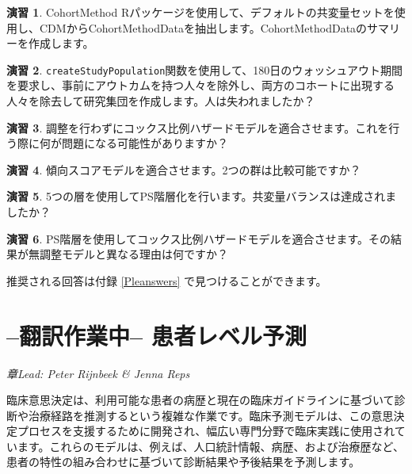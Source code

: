 \documentclass[
  11pt]{book}
\theoremstyle{definition}
\theoremstyle{definition}
\theoremstyle{definition}
\newtheorem{exercise}{演習}[chapter]
\theoremstyle{definition}
\theoremstyle{remark}
\begin{document}
\begin{exercise}
\protect\hypertarget{exr:exercisePle1}{}\label{exr:exercisePle1}CohortMethod Rパッケージを使用して、デフォルトの共変量セットを使用し、CDMからCohortMethodDataを抽出します。CohortMethodDataのサマリーを作成します。
\end{exercise}

\begin{exercise}
\protect\hypertarget{exr:exercisePle2}{}\label{exr:exercisePle2}\texttt{createStudyPopulation}関数を使用して、180日のウォッシュアウト期間を要求し、事前にアウトカムを持つ人々を除外し、両方のコホートに出現する人々を除去して研究集団を作成します。人は失われましたか？
\end{exercise}

\begin{exercise}
\protect\hypertarget{exr:exercisePle3}{}\label{exr:exercisePle3}調整を行わずにコックス比例ハザードモデルを適合させます。これを行う際に何が問題になる可能性がありますか？
\end{exercise}

\begin{exercise}
\protect\hypertarget{exr:exercisePle4}{}\label{exr:exercisePle4}傾向スコアモデルを適合させます。2つの群は比較可能ですか？
\end{exercise}

\begin{exercise}
\protect\hypertarget{exr:exercisePle5}{}\label{exr:exercisePle5}5つの層を使用してPS階層化を行います。共変量バランスは達成されましたか？
\end{exercise}

\begin{exercise}
\protect\hypertarget{exr:exercisePle6}{}\label{exr:exercisePle6}PS階層を使用してコックス比例ハザードモデルを適合させます。その結果が無調整モデルと異なる理由は何ですか？
\end{exercise}

推奨される回答は付録 \ref{Pleanswers} で見つけることができます。

\chapter{--翻訳作業中-- 患者レベル予測}\label{PatientLevelPrediction}

\emph{章Lead: Peter Rijnbeek \& Jenna Reps}


臨床意思決定は、利用可能な患者の病歴と現在の臨床ガイドラインに基づいて診断や治療経路を推測するという複雑な作業です。臨床予測モデルは、この意思決定プロセスを支援するために開発され、幅広い専門分野で臨床実践に使用されています。これらのモデルは、例えば、人口統計情報、病歴、および治療歴など、患者の特性の組み合わせに基づいて診断結果や予後結果を予測します。   
\end{document}
